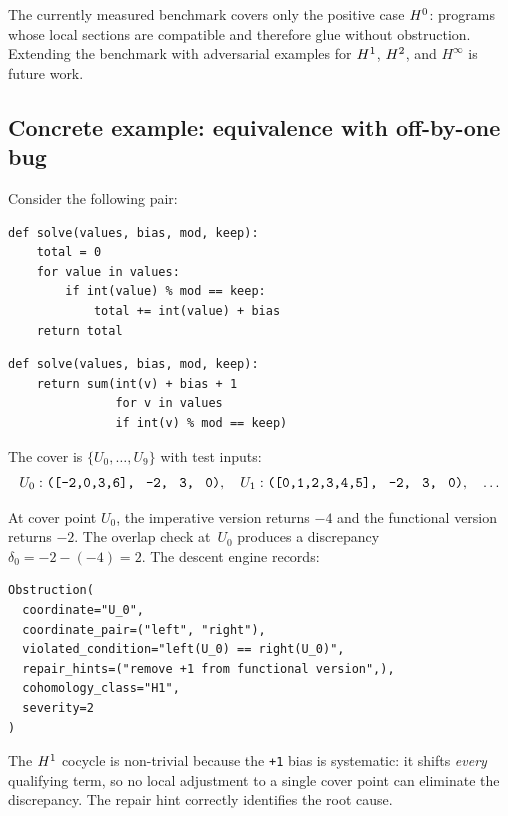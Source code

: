 \documentclass[11pt]{article}
\begin{document}
\noindent
The currently measured benchmark covers only the positive case
$H^{0}$: programs whose local sections are compatible and therefore glue
without obstruction.  Extending the benchmark with adversarial examples for
$H^{1}$, $H^{2}$, and $H^{\infty}$ is future work.

\subsection{Concrete example: equivalence with off-by-one bug}

\begin{example}\label{ex:offbyone}
Consider the following pair:

\begin{lstlisting}[caption={Imperative implementation (correct).},label={lst:left}]
def solve(values, bias, mod, keep):
    total = 0
    for value in values:
        if int(value) % mod == keep:
            total += int(value) + bias
    return total
\end{lstlisting}

\begin{lstlisting}[caption={Functional implementation (\textbf{with bug}: \texttt{+1}).},label={lst:right}]
def solve(values, bias, mod, keep):
    return sum(int(v) + bias + 1
               for v in values
               if int(v) % mod == keep)
\end{lstlisting}

\noindent
The cover is $\{U_0, \ldots, U_9\}$ with test inputs:
\[
U_0: \texttt{([-2,0,3,6],\; -2,\; 3,\; 0)}, \quad
U_1: \texttt{([0,1,2,3,4,5],\; -2,\; 3,\; 0)}, \quad
\ldots
\]

At cover point $U_0$, the imperative version returns $-4$ and the functional
version returns $-2$.  The overlap check at~$U_0$ produces a discrepancy
$\delta_0 = -2 - (-4) = 2$.  The descent engine records:

\begin{lstlisting}[style=jugeo-output]
Obstruction(
  coordinate="U_0",
  coordinate_pair=("left", "right"),
  violated_condition="left(U_0) == right(U_0)",
  repair_hints=("remove +1 from functional version",),
  cohomology_class="H1",
  severity=2
)
\end{lstlisting}

The $H^{1}$ cocycle is non-trivial because the \texttt{+1} bias is
systematic: it shifts \emph{every} qualifying term, so no local adjustment
to a single cover point can eliminate the discrepancy.  The repair hint
correctly identifies the root cause.
\end{example}
\end{document}
